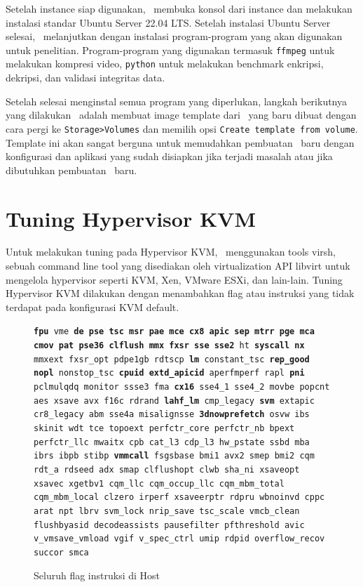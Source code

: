 Setelah instance siap digunakan, \saya\ membuka konsol dari instance dan melakukan instalasi standar Ubuntu Server 22.04 LTS. Setelah instalasi Ubuntu Server selesai, \saya\ melanjutkan dengan instalasi program-program yang akan digunakan untuk penelitian. Program-program yang digunakan termasuk \texttt{ffmpeg} untuk melakukan kompresi video, \texttt{python} untuk melakukan benchmark enkripsi, dekripsi, dan validasi integritas data.

Setelah selesai menginstal semua program yang diperlukan, langkah berikutnya yang dilakukan \saya\ adalah membuat image template dari \vm\ yang baru dibuat dengan cara pergi ke \texttt{Storage>Volumes} dan memilih opsi \texttt{Create template from volume}. Template ini akan sangat berguna untuk memudahkan pembuatan \vm\ baru dengan konfigurasi dan aplikasi yang sudah disiapkan jika terjadi masalah atau jika dibutuhkan pembuatan \vm\ baru.

\section{Tuning Hypervisor KVM}
Untuk melakukan tuning pada Hypervisor KVM, \saya\ menggunakan tools virsh, sebuah command line tool yang disediakan oleh virtualization API libvirt untuk mengelola hypervisor seperti KVM, Xen, VMware ESXi, dan lain-lain. Tuning Hypervisor KVM dilakukan dengan menambahkan flag atau instruksi yang tidak terdapat pada konfigurasi KVM default.

\begin{figure}
    \texttt{\textbf{fpu} vme \textbf{de pse tsc msr pae mce cx8 apic sep mtrr pge mca cmov pat pse36 clflush mmx fxsr sse sse2} ht \textbf{syscall nx} mmxext fxsr\_opt pdpe1gb rdtscp \textbf{lm} constant\_tsc \textbf{rep\_good} \textbf{nopl} nonstop\_tsc \textbf{cpuid extd\_apicid} aperfmperf rapl \textbf{pni} pclmulqdq monitor ssse3 fma \textbf{cx16} sse4\_1 sse4\_2 movbe popcnt aes xsave avx f16c rdrand \textbf{lahf\_lm} cmp\_legacy \textbf{svm} extapic cr8\_legacy abm sse4a misalignsse \textbf{3dnowprefetch} osvw ibs skinit wdt tce topoext perfctr\_core perfctr\_nb bpext perfctr\_llc mwaitx cpb cat\_l3 cdp\_l3 hw\_pstate ssbd mba ibrs ibpb stibp \textbf{vmmcall} fsgsbase bmi1 avx2 smep bmi2 cqm rdt\_a rdseed adx smap clflushopt clwb sha\_ni xsaveopt xsavec xgetbv1 cqm\_llc cqm\_occup\_llc cqm\_mbm\_total cqm\_mbm\_local clzero irperf xsaveerptr rdpru wbnoinvd cppc arat npt lbrv svm\_lock nrip\_save tsc\_scale vmcb\_clean flushbyasid decodeassists pausefilter pfthreshold avic v\_vmsave\_vmload vgif v\_spec\_ctrl umip rdpid overflow\_recov succor smca}
    \caption{Seluruh flag instruksi di Host}
    \label{fig:flag_kvm_host}
\end{figure}

